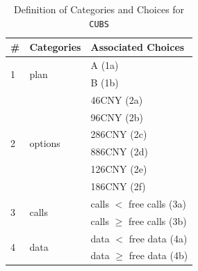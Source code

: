 \documentclass[10pt,journal,compsoc]{IEEEtran}
\begin{document}
\begin{table}[htb]
  \caption{Definition of Categories and Choices for \texttt{CUBS}}
  \label{table:categoriesofcubs}
  \centering
  \begin{tabular}{lll} \toprule
  \#                  &Categories                                                &Associated Choices   \\ \midrule
  \multirow{2}{*}{1}  &\multicolumn{1}{l}{\multirow{2}{*}{plan}}                  &A (1a)        \\
                      &\multicolumn{1}{l}{}                                       &B (1b)         \\ \midrule
                      &\multicolumn{1}{l}{\multirow{6}{*}{options}}               &46CNY (2a)     \\
                      &\multicolumn{1}{l}{}                                       &96CNY (2b)     \\
  \multirow{2}{*}{2}  &\multicolumn{1}{l}{}                                       &286CNY (2c)     \\
                      &\multicolumn{1}{l}{}                                       &886CNY (2d)     \\
                      &\multicolumn{1}{l}{}                                       &126CNY (2e)     \\
                      &\multicolumn{1}{l}{}                                       &186CNY (2f)     \\ \midrule
  \multirow{2}{*}{3}  &\multicolumn{1}{l}{\multirow{2}{*}{calls}}                 &calls $<$ free calls (3a)  \\
                      &\multicolumn{1}{l}{}                                       &calls $\geq$ free calls (3b)  \\ \midrule
  \multirow{2}{*}{4}  &\multicolumn{1}{l}{\multirow{2}{*}{data}}                  &data  $<$ free data (4a)  \\
                      &\multicolumn{1}{l}{}                                       &data $\geq$ free data (4b)  \\ \bottomrule
  \end{tabular}
\end{table}
\end{document}
